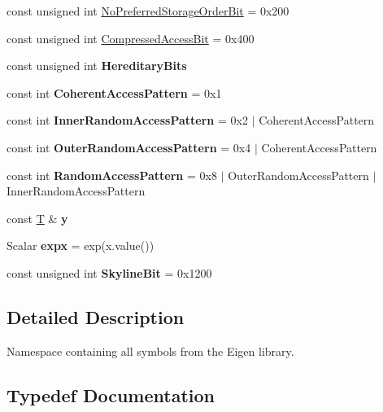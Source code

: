 \begin{DoxyCompactItemize}
\item 
const unsigned int \hyperlink{group__flags_ga3c186ad80ddcf5e2ed3d7ee31cca1860}{No\+Preferred\+Storage\+Order\+Bit} = 0x200
\item 
const unsigned int \hyperlink{group__flags_gaed0244284da47a2b8661261431173caf}{Compressed\+Access\+Bit} = 0x400
\item 
const unsigned int {\bfseries Hereditary\+Bits}
\item 
\mbox{\label{namespace_eigen_ae77c267db06bfa11212bc13dfe8f90a6}} 
const int {\bfseries Coherent\+Access\+Pattern} = 0x1
\item 
\mbox{\label{namespace_eigen_ad3a7fa97adf0db7055c92f466cecc271}} 
const int {\bfseries Inner\+Random\+Access\+Pattern} = 0x2 $\vert$ Coherent\+Access\+Pattern
\item 
\mbox{\label{namespace_eigen_a4eea27a4bf0e3e88d0025ee77628e129}} 
const int {\bfseries Outer\+Random\+Access\+Pattern} = 0x4 $\vert$ Coherent\+Access\+Pattern
\item 
\mbox{\label{namespace_eigen_ad9beed61de5b6f473461b053a43ae793}} 
const int {\bfseries Random\+Access\+Pattern} = 0x8 $\vert$ Outer\+Random\+Access\+Pattern $\vert$ Inner\+Random\+Access\+Pattern
\item 
const \hyperlink{group___sparse_core___module}{T} \& {\bfseries y}
\item 
\mbox{\label{namespace_eigen_ab63002a89341ef7158fe60fa7570e88c}} 
Scalar {\bfseries expx} = exp(x.\+value())
\item 
\mbox{\label{namespace_eigen_ad496e8c77742ade2de35220f8f0469a8}} 
const unsigned int {\bfseries Skyline\+Bit} = 0x1200
\end{DoxyCompactItemize}


\subsection{Detailed Description}
Namespace containing all symbols from the Eigen library. 

\subsection{Typedef Documentation}
\mbox{\label{namespace_eigen_a62e77e0933482dafde8fe197d9a2cfde}} 
